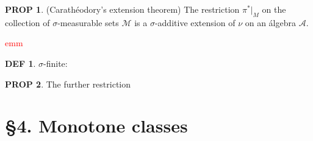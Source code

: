 \documentclass[hidelinks]{article}
\theoremstyle{definition}
\newtheorem*{defin}{DEF}
\theoremstyle{dotless}
\newtheorem{proposition}{PROP}[section]
\theoremstyle{remark}
\begin{document}
\begin{proposition}(Carathéodory's extension theorem) The restriction $\pi^*|_M$ on the collection of $\sigma$-measurable sets $\mathscr{M}$ is a $\sigma$-additive extension of $\nu$ on an álgebra $\mathscr{A}$.
\end{proposition}
\textcolor{red}{emm}

\begin{defin}
$\sigma$-finite:
\end{defin}

\begin{proposition}
The further restriction 
\end{proposition}



\newpage
\section*{\S4. Monotone classes}
\setcounter{section}{4}
\end{document}
